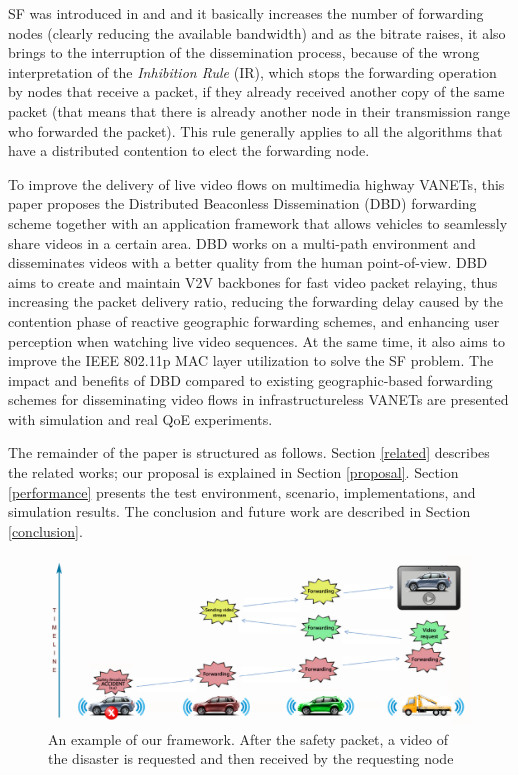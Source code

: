 \documentclass{acm_proc_article-sp}
\begin{document}
SF was introduced in \cite{VTCDeFelice} and \cite{multimediadefelice} and it basically increases the number of forwarding nodes (clearly reducing the available bandwidth) and as the bitrate raises, it also brings to the interruption of the dissemination process, because of the wrong interpretation of the \textit{Inhibition Rule} (IR), which stops the forwarding operation by nodes that receive a packet, if they already received another copy of the same packet (that means that there is already another node in their transmission range who forwarded the packet). This rule generally applies to all the algorithms that have a distributed contention to elect the forwarding node.

To improve the delivery of live video flows on multimedia highway VANETs, this paper proposes the Distributed Beaconless Dissemination (DBD) forwarding scheme  together with an application framework that allows vehicles to seamlessly share videos in a certain area. DBD works on a multi-path environment and disseminates videos with a better quality from the human point-of-view. DBD aims to create and maintain V2V backbones for fast video packet relaying, thus increasing the packet delivery ratio, reducing the forwarding delay caused by the contention phase of reactive geographic forwarding schemes, and enhancing user perception when watching live video sequences. At the same time, it also aims to improve the IEEE 802.11p MAC layer utilization to solve the SF problem. The impact and benefits of DBD compared to existing geographic-based forwarding schemes for disseminating video flows in infrastructureless VANETs are presented with simulation and real QoE experiments.

The remainder of the paper is structured as follows. Section \ref{related} describes the related works; our proposal is explained in Section \ref{proposal}. Section \ref{performance} presents the test environment, scenario, implementations, and simulation results. The conclusion and future work are described in Section \ref{conclusion}.


\begin{figure}[!thb]
\begin{center}
\includegraphics[width=1.5\columnwidth]{./fig/NewBigPicture.eps}
\caption{An example of our framework. After the safety packet, a video of the disaster is requested and then received by the requesting node}
\label{fig:bigpicture}
\end{center}
\end{figure}
\end{document}
